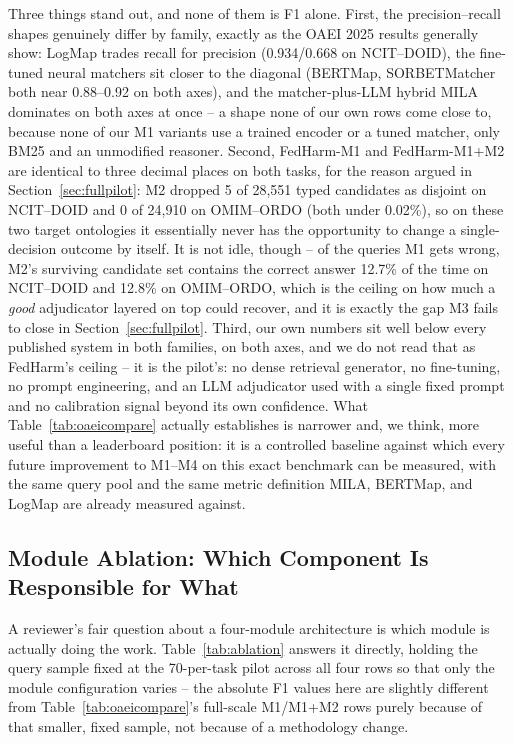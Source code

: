 \documentclass[conference]{IEEEtran}
\begin{document}
Three things stand out, and none of them is F1 alone. First, the precision--recall shapes genuinely differ by family, exactly as the OAEI 2025 results generally show: LogMap trades recall for precision (0.934/0.668 on NCIT--DOID), the fine-tuned neural matchers sit closer to the diagonal (BERTMap, SORBETMatcher both near 0.88--0.92 on both axes), and the matcher-plus-LLM hybrid MILA dominates on both axes at once -- a shape none of our own rows come close to, because none of our M1 variants use a trained encoder or a tuned matcher, only BM25 and an unmodified reasoner. Second, FedHarm-M1 and FedHarm-M1+M2 are identical to three decimal places on both tasks, for the reason argued in Section~\ref{sec:fullpilot}: M2 dropped 5 of 28{,}551 typed candidates as disjoint on NCIT--DOID and 0 of 24{,}910 on OMIM--ORDO (both under 0.02\%), so on these two target ontologies it essentially never has the opportunity to change a single-decision outcome by itself. It is not idle, though -- of the queries M1 gets wrong, M2's surviving candidate set contains the correct answer 12.7\% of the time on NCIT--DOID and 12.8\% on OMIM--ORDO, which is the ceiling on how much a \emph{good} adjudicator layered on top could recover, and it is exactly the gap M3 fails to close in Section~\ref{sec:fullpilot}. Third, our own numbers sit well below every published system in both families, on both axes, and we do not read that as FedHarm's ceiling -- it is the pilot's: no dense retrieval generator, no fine-tuning, no prompt engineering, and an LLM adjudicator used with a single fixed prompt and no calibration signal beyond its own confidence. What Table~\ref{tab:oaeicompare} actually establishes is narrower and, we think, more useful than a leaderboard position: it is a controlled baseline against which every future improvement to M1--M4 on this exact benchmark can be measured, with the same query pool and the same metric definition MILA, BERTMap, and LogMap are already measured against.

\subsection{Module Ablation: Which Component Is Responsible for What}
\label{sec:ablation}

A reviewer's fair question about a four-module architecture is which module is actually doing the work. Table~\ref{tab:ablation} answers it directly, holding the query sample fixed at the 70-per-task pilot across all four rows so that only the module configuration varies -- the absolute F1 values here are slightly different from Table~\ref{tab:oaeicompare}'s full-scale M1/M1+M2 rows purely because of that smaller, fixed sample, not because of a methodology change.
\end{document}
